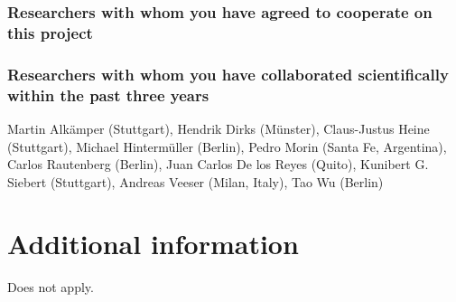 \documentclass[enabledeprecatedfontcommands,cleardoublepage=empty,headsepline,twoside,11pt,DIV=15,BCOR=12mm,final]{scrartcl}
\newcommand{\ppdes}{\textsf{pPDEs}\xspace}
\begin{document}
\subsubsection{Researchers with whom you have agreed to cooperate on this project}
\label{sec:rese-with-whom}



\subsubsection{Researchers with whom you have collaborated scientifically within the past three years}
\label{sec:rese-with-whom-1}
Martin Alk\"amper (Stuttgart), Hendrik Dirks (M\"unster), Claus-Justus Heine (Stuttgart), Michael Hinterm\"uller (Berlin), Pedro Morin (Santa Fe, Argentina), Carlos Rautenberg (Berlin), Juan Carlos De los Reyes (Quito), Kunibert G. Siebert (Stuttgart), Andreas Veeser (Milan, Italy), Tao Wu (Berlin)



\section{Additional information}
\label{sec:addit-inform}

Does not apply.
\end{document}
